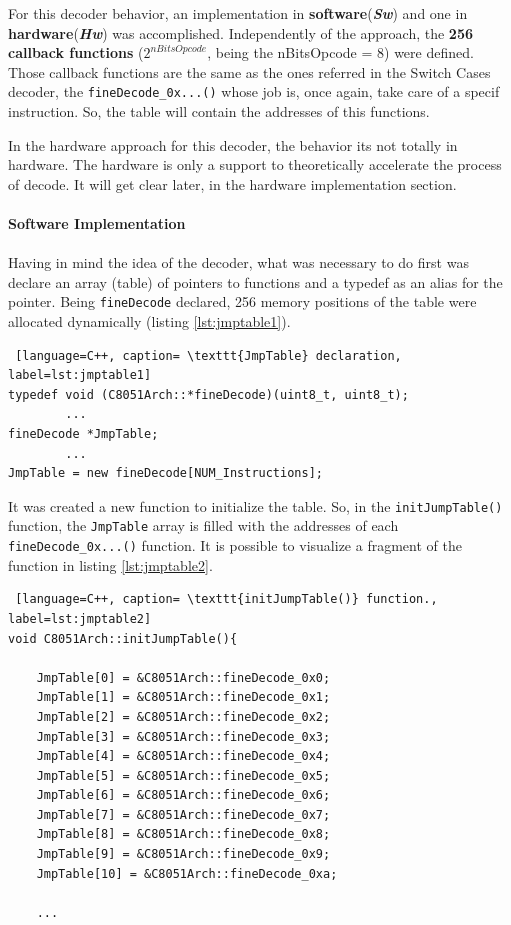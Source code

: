 For this decoder behavior, an implementation in \textbf{software}(\textbf{\textit{Sw}}) and one in \textbf{hardware}(\textit{\textbf{Hw}}) was accomplished. Independently of the approach, the \textbf{256 callback functions} ($2^{nBitsOpcode}$, being the nBitsOpcode = 8) were defined. Those callback functions are the same as the ones referred in the Switch Cases decoder, the \texttt{fineDecode\_0x...()} whose job is, once again, take care of a specif instruction. So, the table will contain the addresses of this functions. 

In the hardware approach for this decoder, the behavior its not totally in hardware. The hardware is only a support to theoretically accelerate the process of decode. It will get clear later, in the hardware implementation section.

\paragraph{Software Implementation}

\paragraph{}

Having in mind the idea of the decoder, what was necessary to do first was declare an array (table) of pointers to functions and a typedef as an alias for the pointer. Being \texttt{fineDecode} declared, 256 memory positions of the table were allocated dynamically (listing \ref{lst:jmptable1}). 

\begin{lstlisting} [language=C++, caption= \texttt{JmpTable} declaration, label=lst:jmptable1]
typedef void (C8051Arch::*fineDecode)(uint8_t, uint8_t);
		...
fineDecode *JmpTable;
		...
JmpTable = new fineDecode[NUM_Instructions];
\end{lstlisting}


It was created a new function to initialize the table. So, in the \texttt{initJumpTable()} function, the \texttt{JmpTable} array is filled with the addresses of each \texttt{fineDecode\_0x...()} function. It is possible to visualize a fragment of the function in listing \ref{lst:jmptable2}.   

\begin{lstlisting} [language=C++, caption= \texttt{initJumpTable()} function., label=lst:jmptable2]
void C8051Arch::initJumpTable(){

    JmpTable[0] = &C8051Arch::fineDecode_0x0;
    JmpTable[1] = &C8051Arch::fineDecode_0x1;
    JmpTable[2] = &C8051Arch::fineDecode_0x2;
    JmpTable[3] = &C8051Arch::fineDecode_0x3;
    JmpTable[4] = &C8051Arch::fineDecode_0x4;
    JmpTable[5] = &C8051Arch::fineDecode_0x5;
    JmpTable[6] = &C8051Arch::fineDecode_0x6;
    JmpTable[7] = &C8051Arch::fineDecode_0x7;
    JmpTable[8] = &C8051Arch::fineDecode_0x8;
    JmpTable[9] = &C8051Arch::fineDecode_0x9;
    JmpTable[10] = &C8051Arch::fineDecode_0xa;
    
    ...
\end{lstlisting}

